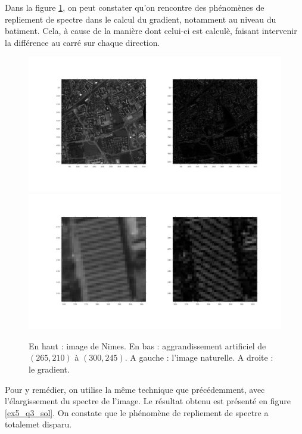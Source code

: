 \documentclass[12pt,a4paper,onecolumn]{article}
\begin{document}
Dans la figure \ref{ex5_q3}, on peut constater qu'on rencontre des phénomènes de repliement de spectre dans le calcul du gradient, notamment au niveau du batiment. Cela, à cause de la manière dont celui-ci est calculè, faisant intervenir la différence au carré sur chaque direction.
\begin{figure}[H]
\begin{center}
	\includegraphics[width = \textwidth]{ex5_q3.jpg}
	\includegraphics[width = \textwidth]{ex5_q3_building.jpg}
\end{center}
\caption{En haut : image de Nimes. En bas : aggrandissement artificiel de $(265, 210)$ à $(300, 245)$. A gauche : l'image naturelle. A droite : le gradient.}
\label{ex5_q3}
\end{figure}

Pour y remédier, on utilise la même technique que précédemment, avec l'élargissement du spectre de l'image. Le résultat obtenu est présenté en figure
\ref{ex5_q3_sol}. On constate que le phénomène de repliement de spectre a totalemet disparu.
\end{document}
